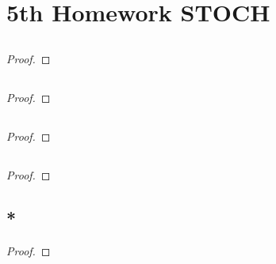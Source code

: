 
\section{5th Homework STOCH}
\subsection{}
\begin{proof}
\end{proof}

\subsection{}
\begin{proof}}
	
\end{proof}
\subsection{}
\begin{proof}
	
\end{proof}
\subsection{}
\begin{proof}
	
\end{proof}

\subsection{}
\begin{proof}
	
\end{proof}

\subsection{*}
\begin{proof}
	
\end{proof}